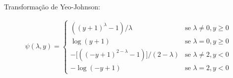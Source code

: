 Transformação de Yeo-Johnson:


\begin{align*}
\psi(\lambda, y) = 
\begin{cases}
((y+1)^\lambda - 1)/\lambda & \text{se } \lambda \neq 0, y \geq 0\\
\log(y+1) & \text{se } \lambda =0 , y \geq 0\\
-\lbrack((-y+1)^{2-\lambda}-1) \rbrack/(2-\lambda) & \text{se } \lambda \neq 2, y < 0\\
-\log(-y+1) & \text{se } \lambda = 2, y <0
\end{cases}
\end{align*}

